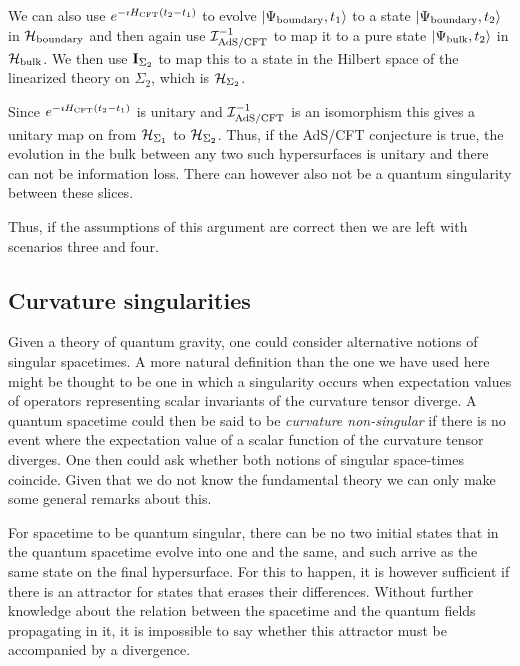 \documentclass[12pt]{article}
\begin{document}
We can also use $e^{-\imath H_{{\rm CFT}} (t_2-t_1)} $ to evolve $| \Psi_{\rm boundary}, t_1 \rangle$ to a state
$| \Psi_{\rm boundary}, t_2  \rangle$ in ${\cal H}_{{\rm boundary}}$ and then again use  ${\cal I}_{{\rm AdS/CFT}}^{-1}$ to map it to a pure
state $|\Psi_{\rm bulk}, t_2 \rangle$ in ${\cal H}_{{\rm bulk}}$.  We then use ${\bf I}_{\Sigma_2}$ to map this to a state in the Hilbert space of
the linearized theory  on $\Sigma_2 $, 
which is ${ \cal H}_{\Sigma_2}$.  



Since $e^{-\imath H_{{\rm CFT}} (t_2-t_1) }$ is unitary and ${\cal I}_{{\rm AdS/CFT}}^{-1}$
is an isomorphism this gives a unitary map on from  $ { \cal H}_{\Sigma_1}$ to ${ \cal H}_{\Sigma_2}$. 
Thus, if the AdS/CFT conjecture is true, 
the evolution in the bulk between any two such hypersurfaces is unitary and there can not be information loss. There can 
however also not be a quantum singularity between these slices.  

Thus, if the assumptions of this argument are correct then we are left with scenarios three and four.



\subsection{Curvature singularities}
\label{curvsing}

Given a theory of quantum gravity, one could consider alternative notions of singular spacetimes. A more natural definition
than the one we have used here might be thought to be one in which 
a singularity occurs when expectation values of operators representing scalar 
invariants of the curvature tensor diverge. A quantum spacetime could then be said to be {\it curvature non-singular} 
if there is no event where the expectation value of a scalar function of the curvature tensor diverges. One then
could ask whether both notions of singular space-times coincide. Given that we do not know
the fundamental theory we can only make some general remarks about this. 

For spacetime to be quantum singular, there can be no two initial states that in the quantum spacetime
evolve into one and the same, and such arrive as the same state on the final hypersurface. For this to happen, it 
is however sufficient if there is an attractor for states that erases their differences. Without further 
knowledge about the relation between the spacetime and the quantum fields propagating in it, it is impossible 
to say whether this attractor must be accompanied by a divergence.
\end{document}
